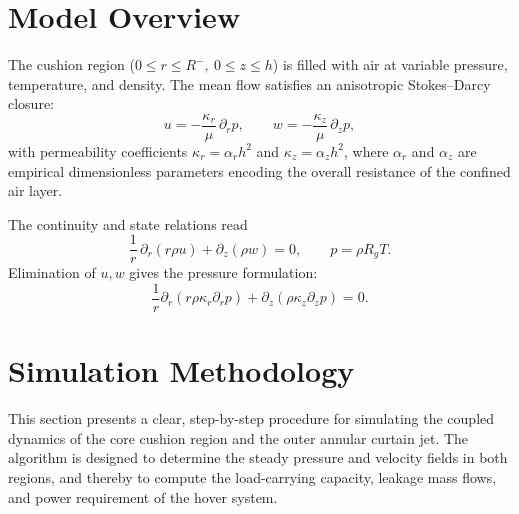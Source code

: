 \documentclass[11pt,a4paper]{article}
\begin{document}
\section{Model Overview}
\label{sec:model-overview}

The cushion region ($0\le r\le R^{-},\ 0\le z\le h$) is filled with air at variable pressure, temperature, and density.
The mean flow satisfies an anisotropic Stokes--Darcy closure:
\begin{equation}
  u = -\frac{\kappa_r}{\mu}\,\partial_r p,\qquad
  w = -\frac{\kappa_z}{\mu}\,\partial_z p,
\end{equation}
with permeability coefficients $\kappa_r=\alpha_r h^2$ and $\kappa_z=\alpha_z h^2$, where $\alpha_r$ and $\alpha_z$ are empirical dimensionless parameters encoding the overall resistance of the confined air layer.

The continuity and state relations read
\begin{equation}
  \frac{1}{r}\,\partial_r\!\left(r\rho u\right)+\partial_z(\rho w)=0,\qquad
  p=\rho R_g T.
\end{equation}
Elimination of $u,w$ gives the pressure formulation:
\begin{equation}
  \frac{1}{r}\partial_r(r\rho\kappa_r\partial_r p)+\partial_z(\rho\kappa_z\partial_z p)=0.
\end{equation}




\section{Simulation Methodology}
\label{sec:simulation-method}

This section presents a clear, step-by-step procedure for simulating the coupled dynamics of the core cushion region and the outer annular curtain jet. The algorithm is designed to determine the steady pressure and velocity fields in both regions, and thereby to compute the load-carrying capacity, leakage mass flows, and power requirement of the hover system.
\end{document}
